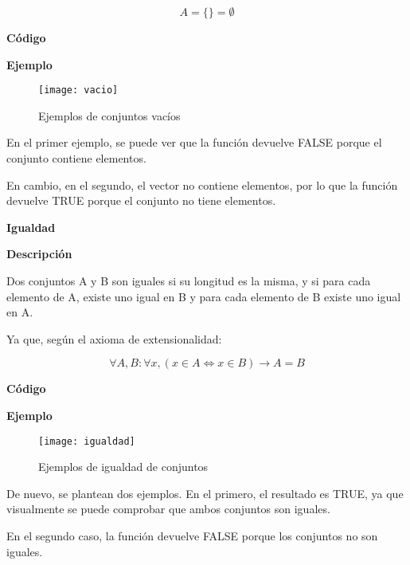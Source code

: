     \[
        A = \{ \} = \emptyset
    \]

    \textbf{C\'odigo}

    
    \bigskip

    \textbf{Ejemplo}

    \begin{figure}[H]
        \centering
        \texttt{[image: vacio]}
        \caption{Ejemplos de conjuntos vac\'ios}
        \label{fig:vacio}
    \end{figure}

    En el primer ejemplo, se puede ver que la funci\'on devuelve FALSE porque el conjunto contiene elementos.

    En cambio, en el segundo, el vector no contiene elementos, por lo que la funci\'on devuelve TRUE porque el conjunto no tiene 
    elementos.
    \\

    \bigskip


\textbf{ \large Igualdad}

    \smallskip

    \textbf{Descripci\'on}

    Dos conjuntos A y B son iguales si su longitud es la misma, y si para cada elemento de A, existe uno igual 
    en B y para cada elemento de B existe uno igual en A.

    Ya que, seg\'un el axioma de extensionalidad:

    \[
        \forall A, B : \forall x, (x \in A \Leftrightarrow x \in B) \to A = B
    \]


    \textbf{C\'odigo}

    
    \bigskip

    \textbf{Ejemplo}

    \begin{figure}[H]
        \centering
        \texttt{[image: igualdad]}
        \caption{Ejemplos de igualdad de conjuntos}
        \label{fig:igualdad}
    \end{figure}

    De nuevo, se plantean dos ejemplos. En el primero, el resultado es TRUE, ya que visualmente se puede comprobar que ambos conjuntos son 
    iguales.

    En el segundo caso, la funci\'on devuelve FALSE porque los conjuntos no son iguales.
    \\



